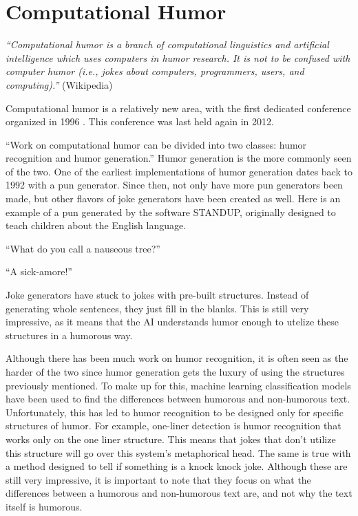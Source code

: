 \section{Computational Humor}
\textit{``Computational humor is a branch of computational linguistics and artificial intelligence which uses computers in humor research. It is not to be confused with computer humor (i.e., jokes about computers, programmers, users, and computing).''} (Wikipedia)

Computational humor is a relatively new area, with the first dedicated conference organized in 1996 \cite{conference}. This conference was last held again in 2012.

``Work on computational humor can be divided into two classes: humor recognition and humor generation.'' \cite{xyz} Humor generation is the more commonly seen of the two. One of the earliest implementations of humor generation dates back to 1992 with a pun generator.\cite{Lessard} Since then, not only have more pun generators been made, but other flavors of joke generators have been created as well. Here is an example of a pun generated by the software STANDUP, originally designed to teach children about the English language.

``What do you call a nauseous tree?''

``A sick-amore!'' \cite{STANDUP}

Joke generators have stuck to jokes with pre-built structures. Instead of generating whole sentences, they just fill in the blanks. This is still very impressive, as it means that the AI understands humor enough to utelize these structures in a humorous way.

Although there has been much work on humor recognition, it is often seen as the harder of the two since humor generation gets the luxury of using the structures previously mentioned. \cite{metatheory} To make up for this, machine learning classification models have been used to find the differences between humorous and non-humorous text. Unfortunately, this has led to humor recognition to be designed only for specific structures of humor. For example, one-liner detection is humor recognition that works only on the one liner structure. This means that jokes that don't utilize this structure will go over this system's metaphorical head. The same is true with a method designed to tell if something is a knock knock joke. Although these are still very impressive, it is important to note that they focus on what the differences between a humorous and non-humorous text are, and not why the text itself is humorous.

